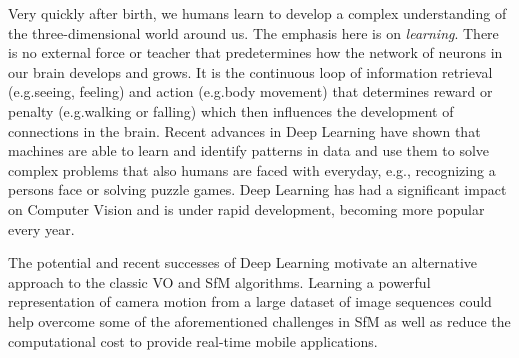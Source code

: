 		Very quickly after birth, we humans learn to develop a complex understanding of the three-dimensional world around us. 
		The emphasis here is on \emph{learning}.
		There is no external force or teacher that predetermines how the network of neurons in our brain develops and grows.
		It is the continuous loop of information retrieval (e.g.\@ seeing, feeling) and action (e.g.\@ body movement) that determines reward or penalty (e.g.\@ walking or falling) which then influences the development of connections in the brain.
		Recent advances in Deep Learning have shown that machines are able to learn and identify patterns in data and use them to solve complex problems that also humans are faced with everyday, e.g., recognizing a persons face or solving puzzle games.
		Deep Learning has had a significant impact on Computer Vision and is under rapid development, becoming more popular every year.
		
		The potential and recent successes of Deep Learning motivate an alternative approach to the classic VO and SfM algorithms.
		Learning a powerful representation of camera motion from a large dataset of image sequences could help overcome some of the aforementioned challenges in SfM as well as reduce the computational cost to provide real-time mobile applications.
		
		
		
		
		
		
